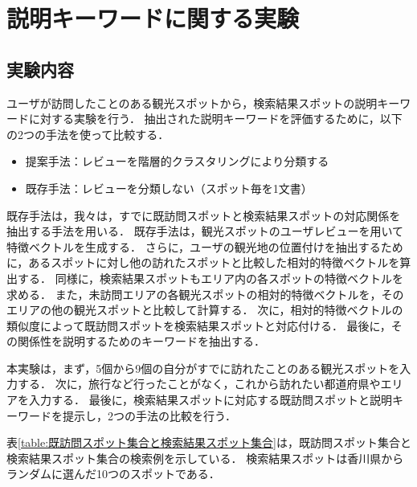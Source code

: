 \documentclass{deimj}
\begin{document}
\section{説明キーワードに関する実験}
\subsection{実験内容}
ユーザが訪問したことのある観光スポットから，検索結果スポットの説明キーワードに対する実験を行う．
抽出された説明キーワードを評価するために，以下の2つの手法を使って比較する．
\begin{itemize}
  \item 提案手法：レビューを階層的クラスタリングにより分類する
  \item 既存手法：レビューを分類しない（スポット毎を1文書）
\end{itemize}

既存手法は，我々は，すでに既訪問スポットと検索結果スポットの対応関係を抽出する手法\cite{潘DEIM}を用いる．
既存手法は，観光スポットのユーザレビューを用いて特徴ベクトルを生成する．
さらに，ユーザの観光地の位置付けを抽出するために，あるスポットに対し他の訪れたスポットと比較した相対的特徴ベクトルを算出する．
同様に，検索結果スポットもエリア内の各スポットの特徴ベクトルを求める．
また，未訪問エリアの各観光スポットの相対的特徴ベクトルを，そのエリアの他の観光スポットと比較して計算する．
次に，相対的特徴ベクトルの類似度によって既訪問スポットを検索結果スポットと対応付ける．
最後に，その関係性を説明するためのキーワードを抽出する．


本実験は，まず，5個から9個の自分がすでに訪れたことのある観光スポットを入力する．
次に，旅行など行ったことがなく，これから訪れたい都道府県やエリアを入力する．
最後に，検索結果スポットに対応する既訪問スポットと説明キーワードを提示し，2つの手法の比較を行う．

表\ref{table:既訪問スポット集合と検索結果スポット集合}は，既訪問スポット集合と検索結果スポット集合の検索例を示している．
検索結果スポットは香川県からランダムに選んだ10つのスポットである．
\end{document}
